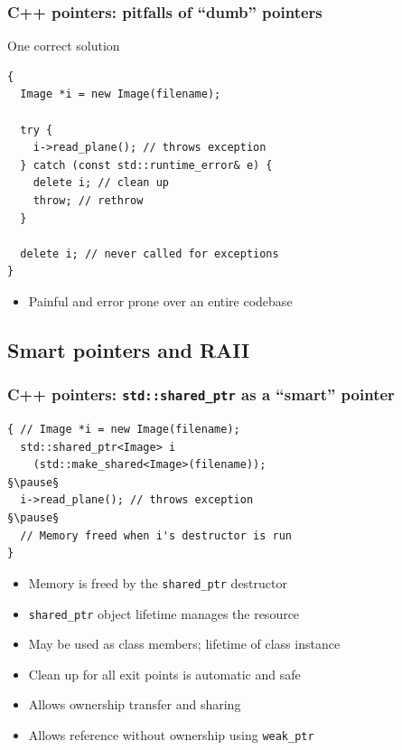 \documentclass[handout]{beamer}
\begin{document}
\begin{frame}[fragile]
  \frametitle{C++ pointers: pitfalls of “dumb” pointers}
  \begin{block}{One correct solution}
  \begin{lstlisting}
{
  Image *i = new Image(filename);

  try {
    i->read_plane(); // throws exception
  } catch (const std::runtime_error& e) {
    delete i; // clean up
    throw; // rethrow
  }

  delete i; // never called for exceptions
}
\end{lstlisting}
  \begin{itemize}
    \pause
  \item Painful and error prone over an entire codebase
  \end{itemize}
  \end{block}
\end{frame}

\subsection{Smart pointers and RAII}
\begin{frame}[fragile]
  \frametitle{C++ pointers: \texttt{std::shared\_ptr} as a “smart” pointer}
  \begin{lstlisting}
{ // Image *i = new Image(filename);
  std::shared_ptr<Image> i
    (std::make_shared<Image>(filename));
§\pause§
  i->read_plane(); // throws exception
§\pause§
  // Memory freed when i's destructor is run
}
\end{lstlisting}
  \begin{itemize}
    \item Memory is freed by the \texttt{shared\_ptr} destructor
      \pause
    \item \texttt{shared\_ptr} object lifetime manages the resource
      \pause
    \item May be used as class members; lifetime of class instance
      \pause
    \item Clean up for all exit points is automatic and safe
      \pause
    \item Allows ownership transfer and sharing
      \pause
    \item Allows reference without ownership using \texttt{weak\_ptr}
  \end{itemize}
\end{frame}
\end{document}
